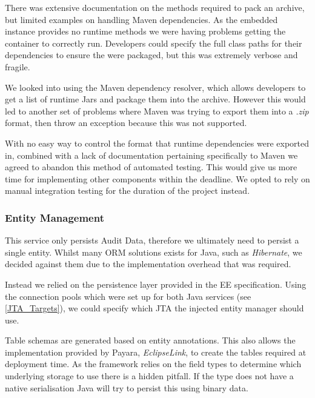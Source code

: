 \par
There was extensive documentation on the methods required to pack an archive, but limited examples on handling Maven dependencies. As the embedded instance provides no runtime methods we were having problems getting the container to correctly run. Developers could specify the full class paths for their dependencies to ensure the were packaged, but this was extremely verbose and fragile.

\par
We looked into using the Maven dependency resolver, which allows developers to get a list of runtime Jars and package them into the archive. However this would led to another set of problems where Maven was trying to export them into a \textit{.zip} format, then throw an exception because this was not supported.

\par
With no easy way to control the format that runtime dependencies were exported in, combined with a lack of documentation pertaining specifically to Maven we agreed to abandon this method of automated testing. This would give us more time for implementing other components within the deadline. We opted to rely on manual integration testing for the duration of the project instead.

\subsubsection{Entity Management}
This service only persists Audit Data, therefore we ultimately need to persist a single entity. Whilst many ORM solutions exists for Java, such as \textit{Hibernate}, we decided against them due to the implementation overhead that was required.

\par
Instead we relied on the persistence layer provided in the EE specification. Using the connection pools which were set up for both Java services (see \ref{JTA_Targets}), we could specify which JTA the injected entity manager should use.

\par
Table schemas are generated based on entity annotations. This also allows the implementation provided by Payara, \textit{EclipseLink}, to create the tables required at deployment time. As the framework relies on the field types to determine which underlying storage to use there is a hidden pitfall. If the type does not have a native serialisation Java will try to persist this using binary data.

